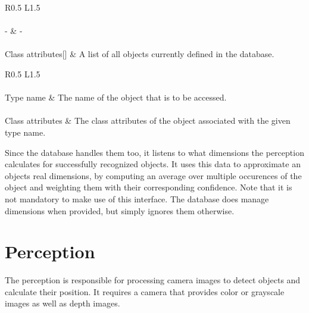 \begin{table}[H]
  \centering
  \caption[Database get-all-objects interface.]{An interface that returns all objects from the database.}
  \label{tab:db-get-all}
  \renewcommand{\arraystretch}{1.5}
  \begin{tabularx}{\textwidth}{R{0.5} L{1.5}}
    \hline
     \\
    \hline
     \\
    - & - \\
    \hline
     \\
    Class attributes[] & A list of all objects currently defined in the database. \\
    \hline
  \end{tabularx}
\end{table}

\begin{table}[H]
  \centering
  \caption[Database get-type interface.]{An interface that returns the class attributes of an object of a specific type.}
  \label{tab:db-get-type}
  \renewcommand{\arraystretch}{1.5}
  \begin{tabularx}{\textwidth}{R{0.5} L{1.5}}
    \hline
     \\
    \hline
     \\
    Type name & The name of the object that is to be accessed. \\
    \hline
     \\
    Class attributes & The class attributes of the object associated with the given type name. \\
    \hline
  \end{tabularx}
\end{table}

Since the database handles them too, it listens to what dimensions the perception calculates for successfully recognized objects. It uses this data to approximate an objects real dimensions, by computing an average over multiple occurences of the object and weighting them with their corresponding confidence. Note that it is not mandatory to make use of this interface. The database does manage dimensions when provided, but simply ignores them otherwise.

\section{Perception} %
\label{sec:arch-perception}
The perception is responsible for processing camera images to detect objects and calculate their position. It requires a camera that provides color or grayscale images as well as depth images. \\


